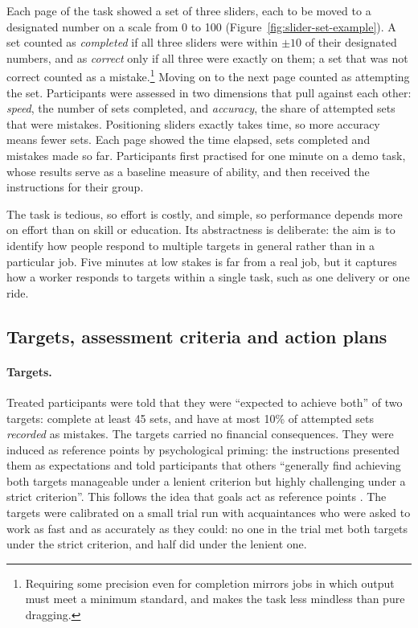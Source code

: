 \documentclass[12pt, letterpaper]{article}
\begin{document}
Each page of the task showed a set of three sliders, each to be moved to a designated number on a scale from 0 to 100 (Figure~\ref{fig:slider-set-example}). A set counted as \emph{completed} if all three sliders were within $\pm 10$ of their designated numbers, and as \emph{correct} only if all three were exactly on them; a set that was not correct counted as a mistake.\footnote{Requiring some precision even for completion mirrors jobs in which output must meet a minimum standard, and makes the task less mindless than pure dragging.} Moving on to the next page counted as attempting the set. Participants were assessed in two dimensions that pull against each other: \emph{speed}, the number of sets completed, and \emph{accuracy}, the share of attempted sets that were mistakes. Positioning sliders exactly takes time, so more accuracy means fewer sets. Each page showed the time elapsed, sets completed and mistakes made so far. Participants first practised for one minute on a demo task, whose results serve as a baseline measure of ability, and then received the instructions for their group.

The task is tedious, so effort is costly, and simple, so performance depends more on effort than on skill or education. Its abstractness is deliberate: the aim is to identify how people respond to multiple targets in general rather than in a particular job. Five minutes at low stakes is far from a real job, but it captures how a worker responds to targets within a single task, such as one delivery or one ride.

\subsection{Targets, assessment criteria and action plans}

\paragraph{Targets.} Treated participants were told that they were ``expected to achieve both'' of two targets: complete at least 45 sets, and have at most 10\% of attempted sets \emph{recorded} as mistakes. The targets carried no financial consequences. They were induced as reference points by psychological priming: the instructions presented them as expectations and told participants that others ``generally find achieving both targets manageable under a lenient criterion but highly challenging under a strict criterion''. This follows the idea that goals act as reference points \parencite{heath.1999.goalsreference}. The targets were calibrated on a small trial run with acquaintances who were asked to work as fast and as accurately as they could: no one in the trial met both targets under the strict criterion, and half did under the lenient one.
\end{document}
